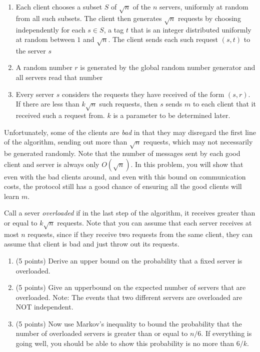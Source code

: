 \documentclass[11pt]{article}
\begin{document}
\begin{enumerate}
\begin{enumerate}
\item Each client chooses a subset $S$ of $\sqrt{n}$ of the $n$ servers, uniformly at random from all such subsets.  The client then generates $\sqrt{n}$ requests by choosing independently for each $s \in S$, a tag $t$ that is an integer distributed uniformly at random between $1$ and $\sqrt{n}$.  The client sends each such request $(s,t)$ to the server $s$
\item A random number $r$ is generated by the global random number generator and all servers read that number
\item Every server $s$ considers the requests they have received of the form $(s,r)$.  If there are less than $k \sqrt{n}$ such requests, then $s$ sends $m$ to each client that it received such a request from.  $k$ is a parameter to be determined later.
\end{enumerate}

Unfortunately, some of the clients are \emph{bad} in that they may disregard the first line of the algorithm, sending out more than $\sqrt{n}$ requests, which may not necessarily be generated randomly.  Note that the number of messages sent by each good client and server is always only $O(\sqrt{n})$.  In this problem, you will show that even with the bad clients around, and even with this bound on communication costs, the protocol still has a good chance of ensuring all the good clients will learn $m$.

Call a sever \emph{overloaded} if in the last step of the algorithm, it receives greater than or equal to $k\sqrt{n}$ requests.  Note that you can assume that each server receives at most $n$ requests, since if they receive two requests from the same client, they can assume that client is bad and just throw out its requests.  
\begin{enumerate}

\item (5 points) Derive an upper bound on the probability that a fixed server is overloaded.

\pagebreak 
  
\item (5 points) Give an upperbound on the expected number of servers that are overloaded.  Note: The events that two different servers are overloaded are NOT independent.

\item (5 points) Now use Markov's inequality to bound the probability that the number of overloaded servers is greater than or equal to $n/6$.  If everything is going well, you should be able to show this probability is no more than $6/k$.



\end{enumerate}
\end{enumerate}
\end{document}
